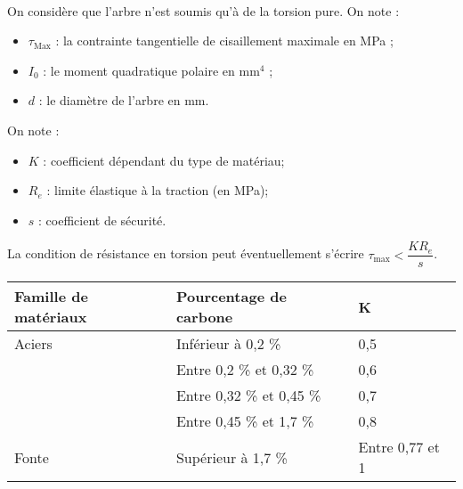 \ifprof
\begin{corrige}~\\
\end{corrige}
\else
\fi

On considère que l’arbre n’est soumis qu’à de la torsion pure.
On note :
\begin{itemize}
\item $\tau_{\text{Max}}$ : la contrainte tangentielle de cisaillement maximale en MPa ;
\item $I_0$ : le moment quadratique polaire en $\text{mm}^4$ ;
\item $d$ : le diamètre de l’arbre en mm.
\end{itemize}
On note :
\begin{itemize}
\item $K$ : coefficient dépendant du type de matériau;
\item $R_e$ : limite élastique à la traction (en MPa);
\item $s$ : coefficient de sécurité.
\end{itemize}

La condition de résistance en torsion peut éventuellement s'écrire $\tau_{\text{max}}< \dfrac{K R_e}{ s}$.

\begin{center}
\begin{tabular}{lll}
\hline
Famille de matériaux & Pourcentage de carbone & K \\ \hline \hline
Aciers & Inférieur à 0,2 \%	&0,5 \\ \hline
&Entre 0,2 \% et 0,32 \%	&0,6 \\ \hline
&Entre 0,32 \% et 0,45 \%	&0,7 \\ \hline
&Entre 0,45 \% et 1,7 \%	&0,8 \\ \hline
Fonte&Supérieur à 1,7 \%	&Entre 0,77 et 1 \\ \hline
\end{tabular}
\end{center}


\ifprof
\begin{corrige}~\\
\end{corrige}
\else
\fi

